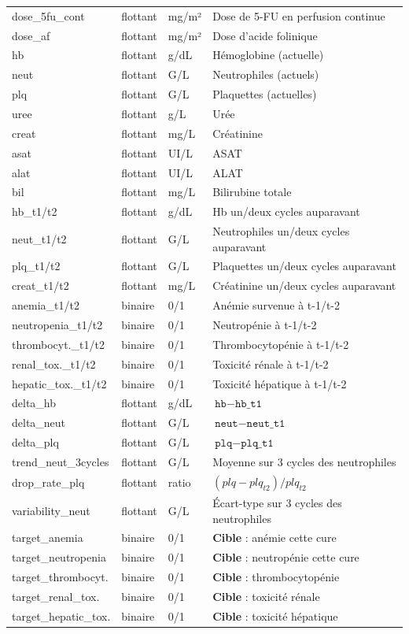 \documentclass[12pt,a4paper]{report}
\begin{document}
\begin{longtable}{p{3.5cm}p{1.5cm}p{2.5cm}p{5.5cm}}
dose\_5fu\_cont & flottant & mg/m² & Dose de 5-FU en perfusion continue \\
dose\_af & flottant & mg/m² & Dose d'acide folinique \\
hb & flottant & g/dL & Hémoglobine (actuelle) \\
neut & flottant & G/L & Neutrophiles (actuels) \\
plq & flottant & G/L & Plaquettes (actuelles) \\
uree & flottant & g/L & Urée \\
creat & flottant & mg/L & Créatinine \\
asat & flottant & UI/L & ASAT \\
alat & flottant & UI/L & ALAT \\
bil & flottant & mg/L & Bilirubine totale \\
hb\_t1/t2 & flottant & g/dL & Hb un/deux cycles auparavant \\
neut\_t1/t2 & flottant & G/L & Neutrophiles un/deux cycles auparavant \\
plq\_t1/t2 & flottant & G/L & Plaquettes un/deux cycles auparavant \\
creat\_t1/t2 & flottant & mg/L & Créatinine un/deux cycles auparavant \\
anemia\_t1/t2 & binaire & 0/1 & Anémie survenue à t-1/t-2 \\
neutropenia\_t1/t2 & binaire & 0/1 & Neutropénie à t-1/t-2 \\
thrombocyt.\_t1/t2 & binaire & 0/1 & Thrombocytopénie à t-1/t-2 \\
renal\_tox.\_t1/t2 & binaire & 0/1 & Toxicité rénale à t-1/t-2 \\
hepatic\_tox.\_t1/t2 & binaire & 0/1 & Toxicité hépatique à t-1/t-2 \\
delta\_hb & flottant & g/dL & $\texttt{hb} - \texttt{hb\_t1}$ \\
delta\_neut & flottant & G/L & $\texttt{neut} - \texttt{neut\_t1}$ \\
delta\_plq & flottant & G/L & $\texttt{plq} - \texttt{plq\_t1}$ \\
trend\_neut\_3cycles & flottant & G/L & Moyenne sur 3 cycles des neutrophiles \\
drop\_rate\_plq & flottant & ratio & $(plq - plq_{t2}) / plq_{t2}$ \\
variability\_neut & flottant & G/L & Écart-type sur 3 cycles des neutrophiles \\
target\_anemia & binaire & 0/1 & \textbf{Cible} : anémie cette cure \\
target\_neutropenia & binaire & 0/1 & \textbf{Cible} : neutropénie cette cure \\
target\_thrombocyt. & binaire & 0/1 & \textbf{Cible} : thrombocytopénie \\
target\_renal\_tox. & binaire & 0/1 & \textbf{Cible} : toxicité rénale \\
target\_hepatic\_tox. & binaire & 0/1 & \textbf{Cible} : toxicité hépatique \\
\end{longtable}
\end{document}
